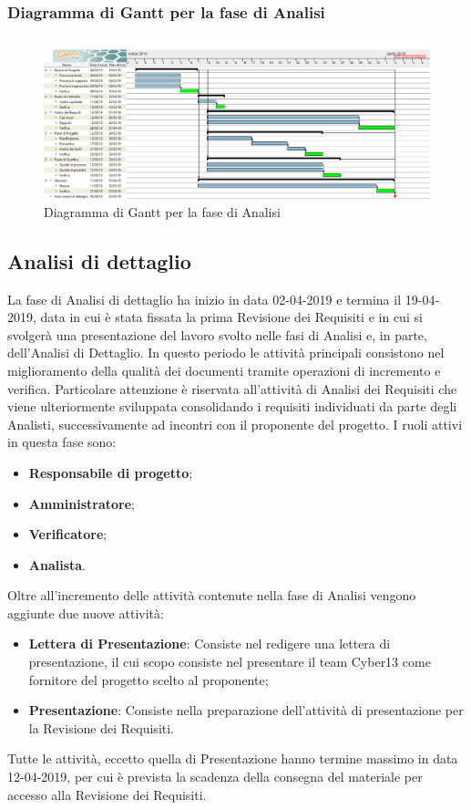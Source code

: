 \subsubsection{Diagramma di Gantt per la fase di Analisi}
\begin{figure}[h!]
\begin{center}
  \includegraphics[scale=0.285]{immagini/AnalisiGantt.png}
  \caption{Diagramma di Gantt per la fase di Analisi}
  \end{center}
\end{figure}

\newpage

\subsection{Analisi di dettaglio}
La fase di Analisi di dettaglio ha inizio in data 02-04-2019 e termina il 19-04-2019, data in cui è stata fissata la prima Revisione dei Requisiti e in cui si svolgerà una presentazione del lavoro svolto nelle fasi di Analisi e, in parte, dell'Analisi di Dettaglio. In questo periodo le attività principali consistono nel miglioramento della qualità dei documenti tramite operazioni di incremento e verifica. Particolare attenzione è riservata all'attività di Analisi dei Requisiti che viene ulteriormente sviluppata consolidando i requisiti individuati da parte degli Analisti, successivamente ad incontri con il proponente del progetto. I ruoli attivi in questa fase sono:
\begin{itemize}
    \item \textbf{Responsabile di progetto};
    \item \textbf{Amministratore};
    \item \textbf{Verificatore};
    \item\textbf{Analista}.
\end{itemize}
Oltre all'incremento delle attività contenute nella fase di Analisi vengono aggiunte due nuove attività:
\begin{itemize}
    \item \textbf{Lettera di Presentazione}: Consiste nel redigere una lettera di presentazione, il cui scopo consiste nel presentare il team Cyber13 come fornitore del progetto scelto al proponente;
    \item \textbf{Presentazione}: Consiste nella preparazione dell'attività di presentazione per la Revisione dei Requisiti.
\end{itemize}
Tutte le attività, eccetto quella di Presentazione hanno termine massimo in data 12-04-2019, per cui è prevista la scadenza della consegna del materiale per accesso alla Revisione dei Requisiti.
